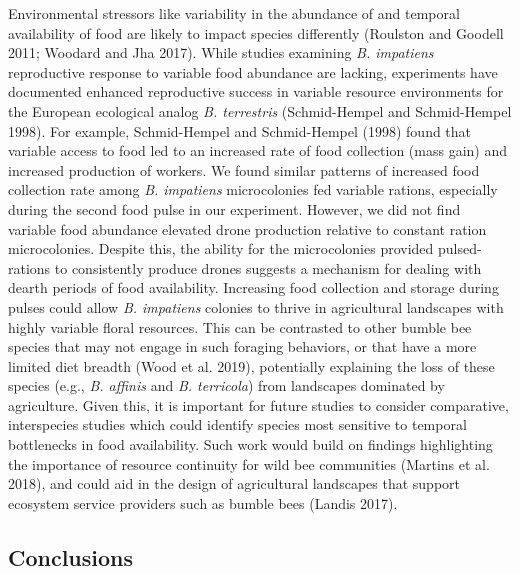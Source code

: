\documentclass[11pt,]{article}
\begin{document}
Environmental stressors like variability in the abundance of and
temporal availability of food are likely to impact species differently
(Roulston and Goodell 2011; Woodard and Jha 2017). While studies
examining \emph{B. impatiens} reproductive response to variable food
abundance are lacking, experiments have documented enhanced reproductive
success in variable resource environments for the European ecological
analog \emph{B. terrestris} (Schmid-Hempel and Schmid-Hempel 1998). For
example, Schmid-Hempel and Schmid-Hempel (1998) found that variable
access to food led to an increased rate of food collection (mass gain)
and increased production of workers. We found similar patterns of
increased food collection rate among \emph{B. impatiens} microcolonies
fed variable rations, especially during the second food pulse in our
experiment. However, we did not find variable food abundance elevated
drone production relative to constant ration microcolonies. Despite
this, the ability for the microcolonies provided pulsed-rations to
consistently produce drones suggests a mechanism for dealing with dearth
periods of food availability. Increasing food collection and storage
during pulses could allow \emph{B. impatiens} colonies to thrive in
agricultural landscapes with highly variable floral resources. This can
be contrasted to other bumble bee species that may not engage in such
foraging behaviors, or that have a more limited diet breadth (Wood et
al. 2019), potentially explaining the loss of these species (e.g.,
\emph{B. affinis} and \emph{B. terricola}) from landscapes dominated by
agriculture. Given this, it is important for future studies to consider
comparative, interspecies studies which could identify species most
sensitive to temporal bottlenecks in food availability. Such work would
build on findings highlighting the importance of resource continuity for
wild bee communities (Martins et al. 2018), and could aid in the design
of agricultural landscapes that support ecosystem service providers such
as bumble bees (Landis 2017).

\hypertarget{conclusions}{%
\subsection{Conclusions}\label{conclusions}}
\end{document}
